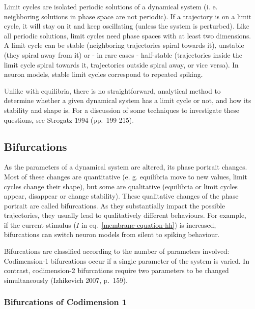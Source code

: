 \documentclass[12pt,a4paper,]{report}
\begin{document}
Limit cycles are isolated periodic solutions of a dynamical system (i.
e. neighboring solutions in phase space are not periodic). If a
trajectory is on a limit cycle, it will stay on it and keep oscillating
(unless the system is perturbed). Like all periodic solutions, limit
cycles need phase spaces with at least two dimensions. A limit cycle can
be stable (neighboring trajectories spiral towards it), unstable (they
spiral away from it) or - in rare cases - half-stable (trajectories
inside the limit cycle spiral towards it, trajectories outside spiral
away, or vice versa). In neuron models, stable limit cycles correspond
to repeated spiking.

Unlike with equilibria, there is no straightforward, analytical method
to determine whether a given dynamical system has a limit cycle or not,
and how its stability and shape is. For a discussion of some techniques
to investigate these questions, see Strogatz 1994 (pp.~199-215).

\subsection{Bifurcations}\label{bifurcations}

As the parameters of a dynamical system are altered, its phase portrait
changes. Most of these changes are quantitative (e. g. equilibria move
to new values, limit cycles change their shape), but some are
qualitative (equilibria or limit cycles appear, disappear or change
stability). These qualitative changes of the phase portrait are called
bifurcations. As they substantially impact the possible trajectories,
they usually lead to qualitatively different behaviours. For example, if
the current stimulus ($I$ in eq.~\ref{membrane-equation-hh}) is
increased, bifurcations can switch neuron models from silent to spiking
behaviour.

Bifurcations are classified according to the number of parameters
involved: Codimension-1 bifurcations occur if a single parameter of the
system is varied. In contrast, codimension-2 bifurcations require two
parameters to be changed simultaneously (Izhikevich 2007, p.~159).

\subsubsection{Bifurcations of Codimension
1}\label{bifurcations-of-codimension-1}
\end{document}
